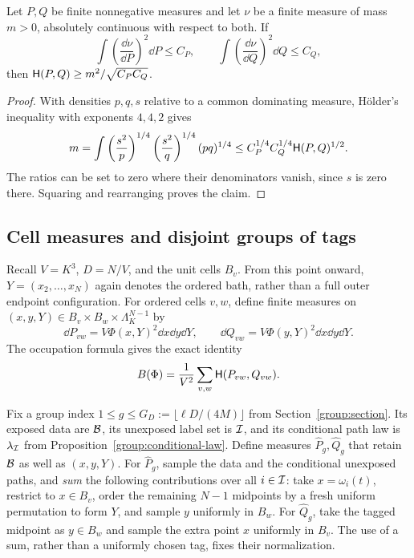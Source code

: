 \begin{lemma}\label{cmp:holder}
Let $P,Q$ be finite nonnegative measures and let $\nu$ be a finite measure
of mass $m>0$, absolutely continuous with respect to both. If
\[
 \int\left(\frac{\dd\nu}{\dd P}\right)^2\dd P\le C_P,
 \qquad
 \int\left(\frac{\dd\nu}{\dd Q}\right)^2\dd Q\le C_Q,
\]
then $\mathsf H(P,Q)\ge m^2/\sqrt{C_PC_Q}$.
\end{lemma}
\begin{proof}
With densities $p,q,s$ relative to a common dominating measure, H\"older's
inequality with exponents $4,4,2$ gives
\[
 m=\int
 \left(\frac{s^2}{p}\right)^{1/4}
 \left(\frac{s^2}{q}\right)^{1/4}(pq)^{1/4}
 \le C_P^{1/4}C_Q^{1/4}\mathsf H(P,Q)^{1/2}.
\]
The ratios can be set to zero where their denominators vanish, since $s$ is
zero there. Squaring and rearranging proves the claim.
\end{proof}

\subsection{Cell measures and disjoint groups of tags}

Recall $V=K^3$, $D=N/V$, and the unit cells $B_v$. From this point onward,
$Y=(x_2,\ldots,x_N)$ again denotes the ordered bath, rather than a full
outer endpoint configuration. For ordered cells $v,w$, define
finite measures on $(x,y,Y)\in B_v\times B_w\times\Lambda_K^{N-1}$ by
\begin{equation}\label{cmp:cell-measures}
 \dd P_{vw}=V\Phi(x,Y)^2\dd x\dd y\dd Y,
 \qquad
 \dd Q_{vw}=V\Phi(y,Y)^2\dd x\dd y\dd Y.
\end{equation}
The occupation formula gives the exact identity
\begin{equation}\label{cmp:cell-affinity}
 B(\Phi)=\frac1{V^2}\sum_{v,w}\mathsf H(P_{vw},Q_{vw}).
\end{equation}

Fix a group index
$1\le g\le G_D:=\lfloor\ell D/(4M)\rfloor$ from
Section~\ref{group:section}. Its exposed data are $\mathcal B$, its unexposed label
set is $\mathcal I$, and its conditional path law is $\lambda_{\mathcal I}$ from
Proposition~\ref{group:conditional-law}. Define measures
$\widehat P_g,\widehat Q_g$ that retain $\mathcal B$ as well as $(x,y,Y)$.
For $\widehat P_g$, sample the data and the conditional unexposed paths, and
\emph{sum} the following contributions over all $i\in\mathcal I$:
take $x=\omega_i(t)$, restrict to $x\in B_v$, order the remaining $N-1$
midpoints by a fresh uniform permutation to form $Y$, and sample $y$
uniformly in $B_w$. For $\widehat Q_g$, take the tagged midpoint as
$y\in B_w$ and sample the extra point $x$ uniformly in $B_v$.
The use of a sum, rather than a uniformly chosen tag, fixes their
normalization.

